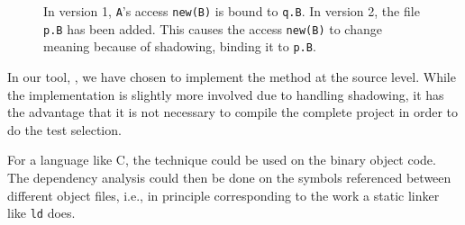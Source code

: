 {\begin{figure}
\begin{adjustbox}{max width=\linewidth}
\end{adjustbox}
  \caption{In version 1, \texttt{A}'s access \texttt{new(B)} is bound to \texttt{q.B}. In version 2, the file \texttt{p.B} has been added. This causes the access \texttt{new(B)} to change meaning because of shadowing, binding it to \texttt{p.B}.}
  \label{shadow}
\end{figure}

In our tool, \ourtool{}, we have chosen to implement the method at the source level. While the
implementation is slightly more involved due to handling shadowing, it has the advantage that it is not necessary to compile the complete project in order to do the test selection. 

For a language like C, the technique could be used on the binary object code. The dependency analysis could then be done on the symbols referenced between different object files, i.e., in principle corresponding to the work a static linker like \texttt{ld} does.

}
